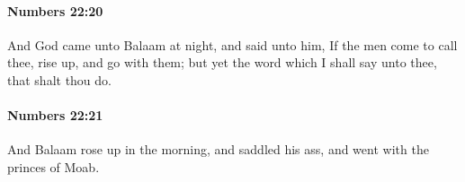 		\paragraph{Numbers 22:20} %
			\label{NUMBERS-22-20}

			And God came unto Balaam at night, and said unto him, If the men come to call thee, rise up, and go with them; but yet the word which I shall say unto thee, that shalt thou do.


		\paragraph{Numbers 22:21} %
			\label{NUMBERS-22-21}

			And Balaam rose up in the morning, and saddled his ass, and went with the princes of Moab.


